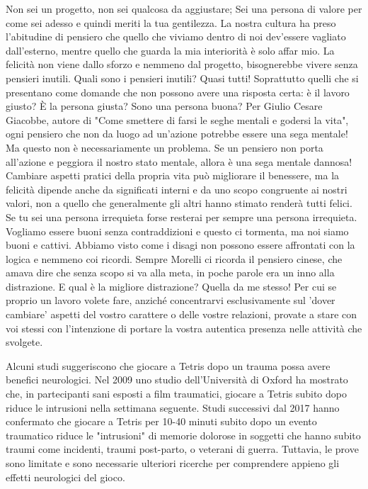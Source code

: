 \documentclass[12pt]{book} %
\begin{document}
Non sei un progetto, non sei qualcosa da aggiustare; Sei una
persona di valore per come sei adesso e quindi meriti la tua gentilezza. La nostra cultura ha preso l'abitudine di
pensiero che quello che viviamo dentro di noi dev'essere vagliato dall'esterno, mentre quello che
guarda la mia interiorità è solo affar mio. La felicità non viene dallo sforzo e nemmeno dal
progetto, bisognerebbe vivere senza pensieri inutili. Quali sono i pensieri inutili? Quasi tutti! Soprattutto quelli
che si presentano come domande che  non possono avere una risposta certa: è il lavoro giusto? È la persona giusta? Sono una persona
buona? 
Per Giulio Cesare Giacobbe, autore di "Come smettere di farsi le seghe mentali e godersi la vita", ogni pensiero che non da luogo ad un'azione potrebbe essere una sega mentale! Ma questo non è necessariamente un problema. Se un pensiero non porta all'azione e peggiora il nostro stato mentale, allora è una sega mentale dannosa!
Cambiare aspetti pratici della propria vita può migliorare il benessere, ma la felicità dipende anche da significati interni e da uno scopo congruente ai nostri valori, non a quello che generalmente gli altri hanno stimato renderà tutti felici. Se tu sei una persona irrequieta forse resterai per sempre una persona irrequieta. Vogliamo
essere buoni senza contraddizioni e questo ci tormenta, ma noi siamo buoni e cattivi. Abbiamo visto come i disagi non
possono essere affrontati con la logica e nemmeno coi ricordi. 
Sempre Morelli ci ricorda il pensiero cinese, che amava dire che senza scopo si va alla meta, in poche parole era un inno alla distrazione. E qual è la migliore distrazione? Quella da me stesso! Per cui se proprio un lavoro volete fare, anziché concentrarvi esclusivamente sul 'dover cambiare' aspetti del vostro carattere o delle vostre relazioni, provate a stare con voi stessi con l'intenzione di portare la vostra autentica presenza nelle attività che svolgete. 

\begin{mdframed}[linewidth=1pt]
Alcuni studi suggeriscono che giocare a Tetris dopo un trauma possa avere benefici neurologici. Nel 2009 uno studio dell’Università di Oxford ha mostrato che, in partecipanti sani esposti a film traumatici, giocare a Tetris subito dopo riduce le intrusioni nella settimana seguente. Studi successivi dal 2017 hanno confermato che giocare a Tetris per 10-40 minuti subito dopo un evento traumatico riduce le "intrusioni" di memorie dolorose in soggetti che hanno subito traumi come incidenti, traumi post-parto, o veterani di guerra. Tuttavia, le prove sono limitate e sono necessarie ulteriori ricerche per comprendere appieno gli effetti neurologici del gioco.
\end{mdframed}
\end{document}
